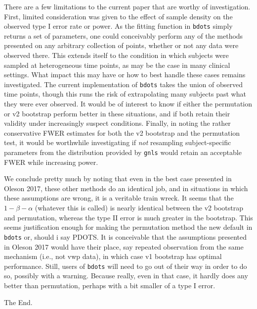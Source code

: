 \documentclass{article}
\newcommand{\xt}{\texttt}
\begin{document}
There are a few limitations to the current paper that are worthy of investigation. First, limited consideration was given to the effect of sample density on the observed type I error rate or power. As the fitting function in \xt{bdots} simply returns a set of parameters, one could conceivably perform any of the methods presented on any arbitrary collection of points, whether or not any data were observed there. This extends itself to the condition in which subjects were sampled at heterogeneous time points, as may be the case in many clinical settings. What impact this may have or how to best handle these cases remains investigated. The current implementation of \xt{bdots} takes the union of observed time points, though this runs the risk of extrapolating many subjects past what they were ever observed. It would be of interest to know if either the permutation or v2 bootstrap perform better in these situations, and if both retain their validity under increasingly suspect conditions. Finally, in noting the rather conservative FWER estimates for both the v2 bootstrap and the permutation test, it would be worthwhile investigating if \textit{not} resampling subject-specific parameters from the distribution provided by \xt{gnls} would retain an acceptable FWER while increasing power.

We conclude pretty much by noting that even in the best case presented in Oleson 2017, these other methods do an identical job, and in situations in which these assumptions are wrong, it is a veritable train wreck. It seems that the $1 - \beta - \alpha$ (whatever this is called) is nearly identical between the v2 bootstrap and permutation, whereas the type II error is much greater in the bootstrap. This seems justification enough for making the permutation method the new default in \xt{bdots} or, should i say PDOTS. It is conceivable that the assumptions presented in Oleson 2017 would have their place, say repeated observation from the same mechanism (i.e., not vwp data), in which case v1 bootstrap has optimal performance. Still, users of \xt{bdots} will need to go out of their way in order to do so, possibly with a warning. Because really, even in that case, it hardly does any better than permutation, perhaps with a bit smaller of a type I error.

The End.


\end{document}
